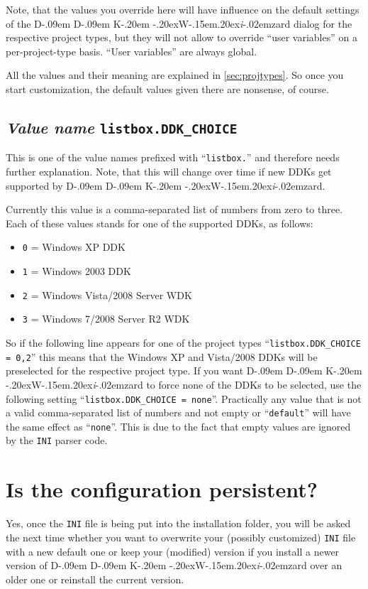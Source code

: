 \documentclass[a4paper,titlepage]{report}
\def\ddkwiz{\texorpdfstring{D\kern-.09em D\kern-.09em K\kern-.20em \raise-.20ex\hbox{W}\kern-.15em\raise.20ex\hbox{\it{i}}\kern-.02em{zard}}{DDKWizard}}
\begin{document}
Note, that the values you override here will have influence on the default settings
of the \ddkwiz{} dialog for the respective project types, but they will not allow
to override ``user variables'' on a per-project-type basis. ``User variables'' are
always global.

All the values and their meaning are explained in \autoref{sec:projtypes}.
So once you start customization, the default values given there are nonsense,
of course.

\subsection{\emph{Value name} \texttt{listbox.DDK\_CHOICE}}
\label{sec:ddkchoice}
This is one of the value names prefixed with ``\texttt{listbox.}'' and therefore
needs further explanation. Note, that this will change over time if new DDKs get
supported by \ddkwiz{}.

Currently this value is a comma-separated list of numbers from zero to three.
Each of these values stands for one of the supported DDKs, as follows:

\begin{itemize}
  \item \texttt{0} = Windows XP DDK
  \item \texttt{1} = Windows 2003 DDK
  \item \texttt{2} = Windows Vista/2008 Server WDK
  \item \texttt{3} = Windows 7/2008 Server R2 WDK
\end{itemize}

So if the following line appears for one of the project types ``\verb+listbox.DDK_CHOICE = 0,2+''
this means that the Windows XP and Vista/2008 DDKs will be preselected for the respective
project type. If you want \ddkwiz{} to force none of the DDKs to be selected,
use the following setting ``\verb+listbox.DDK_CHOICE = none+''. Practically any value
that is not a valid comma-separated list of numbers and not empty or ``\texttt{default}''
will have the same effect as ``\texttt{none}''. This is due to the fact that empty
values are ignored by the \texttt{INI} parser code.

\section{Is the configuration persistent?}
\label{sec:persistentcfg}
Yes, once the \texttt{INI} file is being put into the installation folder, you will be asked
the next time whether you want to overwrite your (possibly customized) \texttt{INI} file with
a new default one or keep your (modified) version if you install a newer version of
\ddkwiz{} over an older one or reinstall the current version.
\end{document}
